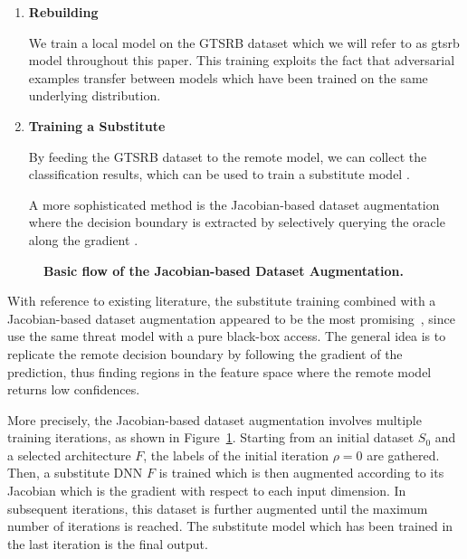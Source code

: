\begin{enumerate}
\item[1.] \textbf{Rebuilding}

We train a local model on the GTSRB dataset which we will refer to as gtsrb model throughout this paper.
This training exploits the fact that adversarial examples transfer between models which have been trained on the same underlying distribution.

\item[2.] \textbf{Training a Substitute}

By feeding the GTSRB dataset to the remote model, we can collect the classification results, which can be used to train a substitute model \cite{tramer2016stealing}.

A more sophisticated method is the Jacobian-based dataset augmentation where the decision boundary is extracted by selectively querying the oracle along the gradient \cite{papernot2017practical}.
\end{enumerate}

\begin{figure}
	
	\caption{\textbf{Basic flow of the Jacobian-based Dataset Augmentation.} \cite{papernot2017practical}}
	\label{fig:jbda}
\end{figure}

With reference to existing literature, the substitute training combined with a Jacobian-based dataset augmentation appeared to be the most promising~\cite{papernot2017practical}, since \citeauthor{papernot2016cleverhans} use the same threat model with a pure black-box access.
The general idea is to replicate the remote decision boundary by following the gradient of the prediction, thus finding regions in the feature space where the remote model returns low confidences.

More precisely, the Jacobian-based dataset augmentation involves multiple training iterations, as shown in Figure~\ref{fig:jbda}.
Starting from an initial dataset $S_0$ and a selected architecture $F$, the labels of the initial iteration $\rho = 0$ are gathered.
Then, a substitute DNN $F$ is trained which is then augmented according to its Jacobian which is the gradient with respect to each input dimension.
In subsequent iterations, this dataset is further augmented until the maximum number of iterations is reached.
The substitute model which has been trained in the last iteration is the final output.

